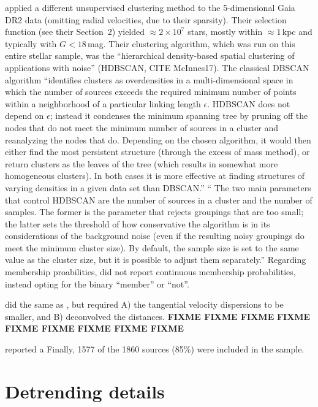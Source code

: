 \documentclass[12pt,twocolumn,tighten]{aastex63}
\begin{document}
applied a different unsupervised
clustering method to the 5-dimensional Gaia DR2 data (omitting radial
velocities, due to their sparsity).  Their selection function (see
their Section~2) yielded $\approx 2\times 10^7$ stars, mostly within
$\approx 1$\,kpc and typically with $G<18$\,mag.  Their clustering
algorithm, which was run on this entire  stellar sample,
 was the ``hierarchical density-based spatial clustering of
applications with noise'' (HDBSCAN, CITE McInnes17).  The classical
DBSCAN algorithm ``identifies clusters as overdensities in a
multi-dimensional space in which the number of sources exceeds the
required minimum number of points within a neighborhood of a
particular linking length $\epsilon$.  HDBSCAN does not depend on
$\epsilon$; instead it condenses the minimum spanning tree by pruning
off the nodes that do not meet the minimum number of sources in a
cluster and reanalyzing the nodes that do. Depending on the chosen
algorithm, it would then either find the most persistent structure
(through the excess of mass method), or return clusters as the leaves
of the tree (which results in somewhat more homogeneous clusters). In
both cases it is more effective at finding structures of varying
densities in a given data set than DBSCAN.''
`` The two main parameters that control HDBSCAN are the number of
sources in a cluster and the number of samples. The former is the
parameter that rejects groupings that are too small; the latter sets
the threshold of how conservative the algorithm is in its
considerations of the background noise (even if the resulting noisy
groupings do meet the minimum cluster size).  By default, the sample
size is set to the same value as the cluster size, but it is possible
to adjust them separately.''
Regarding membership proabilities,
 did not report continuous membership
probabilities, instead opting for the binary ``member'' or ``not''.

 did the same as
, but required A) the tangential
velocity dispersions to be smaller, and B) deconvolved the distances.
{\bf FIXME FIXME FIXME}
{\bf FIXME FIXME FIXME}
{\bf FIXME FIXME FIXME}

\citet{meingast_2021} reported a 
Finally, 1577 of the 1860 \citet{meingast_2021} sources (85\%)
were included in the \citet{kounkel_untangling_2019} sample.  





\section{Detrending details}
\label{app:detrending}
\end{document}
